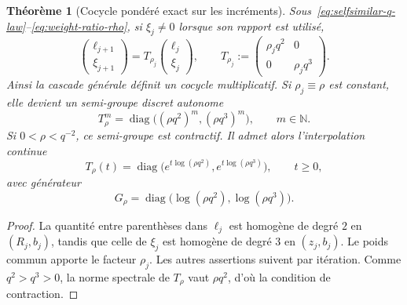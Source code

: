 \documentclass[11pt,a4paper]{article}
\newtheorem{theorem}{Théorème}[section]
\newcommand{\N}{\mathbb N}
\begin{document}
\begin{theorem}[Cocycle pondéré exact sur les incréments]\label{thm:increment-weighted-cocycle}
Sous~\eqref{eq:selfsimilar-q-law}--\eqref{eq:weight-ratio-rho}, si $\xi_j\ne0$ lorsque son rapport est utilisé,
\begin{equation}\label{eq:increment-cocycle}
 \boxed{
 \begin{pmatrix}\ell_{j+1}\\ \xi_{j+1}\end{pmatrix}
 =T_{\rho_j}
 \begin{pmatrix}\ell_j\\ \xi_j\end{pmatrix},
 \qquad
 T_{\rho_j}:=
 \begin{pmatrix}
  \rho_jq^2&0\\0&\rho_jq^3
 \end{pmatrix}.}
\end{equation}
Ainsi la cascade générale définit un cocycle multiplicatif. Si $\rho_j\equiv\rho$ est constant, elle devient un semi-groupe discret autonome
\begin{equation}\label{eq:Trho-semigroup}
 T_\rho^m=\operatorname{diag}\bigl((\rho q^2)^m,(\rho q^3)^m\bigr),
 \qquad m\in\N.
\end{equation}
Si $0<\rho<q^{-2}$, ce semi-groupe est contractif. Il admet alors l'interpolation continue
\begin{equation}\label{eq:continuous-semigroup}
 T_\rho(t)=
 \operatorname{diag}\bigl(e^{t\log(\rho q^2)},e^{t\log(\rho q^3)}\bigr),
 \qquad t\ge0,
\end{equation}
avec générateur
\[
 G_\rho=\operatorname{diag}\bigl(\log(\rho q^2),\log(\rho q^3)\bigr).
\]
\end{theorem}

\begin{proof}
La quantité entre parenthèses dans $\ell_j$ est homogène de degré $2$ en $(R_j,b_j)$, tandis que celle de $\xi_j$ est homogène de degré $3$ en $(z_j,b_j)$. Le poids commun apporte le facteur $\rho_j$. Les autres assertions suivent par itération. Comme $q^2>q^3>0$, la norme spectrale de $T_\rho$ vaut $\rho q^2$, d'où la condition de contraction.
\end{proof}
\end{document}
